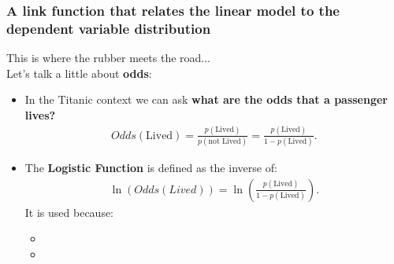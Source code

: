 \documentclass[aspectratio=169]{beamer}
\begin{document}
\begin{frame}
\frametitle{A link function that relates the linear model to the dependent variable distribution}

This is where the rubber meets the road...\\
\bigskip
Let's talk a little about \textbf{odds}:
\begin{itemize}
\item In the Titanic context we can ask \textbf{what are the odds that a passenger lives?}
\begin{align*}
Odds(\mbox{Lived}) = \frac{p(\mbox{Lived})}{p(\mbox{not Lived})} = \frac{p(\mbox{Lived})}{1 - p(\mbox{Lived})}.
\end{align*}
\item The \textbf{Logistic Function} is defined as the inverse of:
\begin{align*}
 \ln\left(Odds(Lived)\right) = \ln\left(\frac{p(\mbox{Lived})}{1 - p(\mbox{Lived})}\right).
\end{align*}
It is used because:
\begin{itemize}
\item[] %
\item[] %
\end{itemize}

\end{itemize}

\end{frame}
\end{document}
